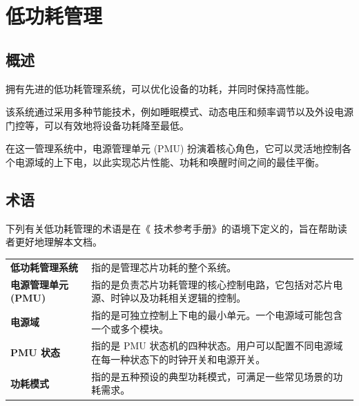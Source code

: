 \documentclass[main\_\_CN.tex]{subfiles}
\begin{document}

\ifglobal
\else
    {\let\clearpage\relax \listoftodos}
    {\let\clearpage\relax \listofdonetodos}
    \tableofcontents
\fi






\hypertarget{lowpowm}{}
\chapter{低功耗管理}\label{mod:lowpowm}

\section{概述}

\chipname{} 拥有先进的低功耗管理系统，可以优化设备的功耗，并同时保持高性能。

该系统通过采用多种节能技术，例如睡眠模式、动态电压和频率调节以及外设电源门控等，可以有效地将设备功耗降至最低。

在这一管理系统中，电源管理单元 (PMU) 扮演着核心角色，它可以灵活地控制各个电源域的上下电，以此实现芯片性能、功耗和唤醒时间之间的最佳平衡。

\section{术语}

下列有关低功耗管理的术语是在《\chipname{} 技术参考手册》的语境下定义的，旨在帮助读者更好地理解本文档。

\begin{longtable}[c]{ R{4cm} p{12cm} }
\textbf{低功耗管理系统} & 指的是管理芯片功耗的整个系统。\\
\textbf{电源管理单元 (PMU)} & 指的是负责芯片功耗管理的核心控制电路，它包括对芯片电源、时钟以及功耗相关逻辑的控制。\\
\textbf{电源域} & 指的是可独立控制上下电的最小单元。一个电源域可能包含一个或多个模块。 \\
\textbf{PMU 状态} & 指的是 PMU 状态机的四种状态。用户可以配置不同电源域在每一种状态下的时钟开关和电源开关。\\
\textbf{功耗模式} & 指的是五种预设的典型功耗模式，可满足一些常见场景的功耗需求。\\
\end{longtable}
\end{document}
